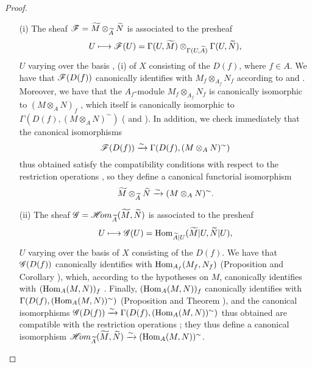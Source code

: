 \begin{proof}
\label{proof-1.1.3.12}
\medskip\noindent
\begin{itemize}
  \item[(i)] The sheaf $\mathscr{F}=\widetilde{M}\otimes_{\widetilde{A}}\widetilde{N}$ is associated to
    the presheaf
    \[
      U\longmapsto\mathscr{F}(U)
      =\Gamma(U,\widetilde{M})\otimes_{\Gamma(U,\widetilde{A})}\Gamma(U,\widetilde{N}),
    \]
    $U$ varying over the basis , (i) of $X$ consisting of the
    $D(f)$, where $f\in A$. We have that $\mathscr{F}(D(f))$ canonically identifies with
    $M_f\otimes_{A_f}N_f$ according to  and .
    Moreover, we have that the $A_f$-module $M_f\otimes_{A_f}N_f$ is canonically
    isomorphic to $(M\otimes_A N)_f$ , which itself is canonically
    isomorphic to $\Gamma(D(f),(M\otimes_A N)^\sim)$ ( and
    ). In addition, we check immediately that the canonical
    isomorphisms
    \[
      \mathscr{F}(D(f))\xrightarrow{\sim}\Gamma(D(f),(M\otimes_A N)^\sim)
    \]
    thus obtained satisfy the compatibility conditions with respect to the restriction
    operations , so they define a canonical functorial isomorphism
    \[
      \widetilde{M}\otimes_{\widetilde{A}}\widetilde{N}\xrightarrow{\sim}(M\otimes_A N)^\sim.
    \]
  \item[(ii)] The sheaf $\mathscr{G}=\mathscr{H}\!{om}_{\widetilde{A}}(\widetilde{M},\widetilde{N})$ is associated
    to the presheaf
    \[
      U\longmapsto\mathscr{G}(U)={\mathop{\mathrm{Hom}}\nolimits}_{\widetilde{A}|U}(\widetilde{M}|U,\widetilde{N}|U),
    \]
    $U$ varying over the basis of $X$ consisting of the $D(f)$. We have that $\mathscr{G}(D(f))$ canonically
    identifies with ${\mathop{\mathrm{Hom}}\nolimits}_{A_f}(M_f,N_f)$ (Proposition  and
    Corollary ), which, according to the hypotheses on $M$, canonically
    identifies with $({\mathop{\mathrm{Hom}}\nolimits}_A(M,N))_f$ . Finally, $({\mathop{\mathrm{Hom}}\nolimits}_A(M,N))_f$
    canonically identifies with $\Gamma(D(f),({\mathop{\mathrm{Hom}}\nolimits}_A(M,N))^\sim)$ (Proposition 
    and Theorem ), and the canonical isomorphisms
    $\mathscr{G}(D(f))\xrightarrow{\sim}\Gamma(D(f),({\mathop{\mathrm{Hom}}\nolimits}_A(M,N))^\sim)$ thus obtained are compatible with the restriction
    operations ; they thus define a canonical isomorphism
    $\mathscr{H}\!{om}_{\widetilde{A}}(\widetilde{M},\widetilde{N})\xrightarrow{\sim}({\mathop{\mathrm{Hom}}\nolimits}_A(M,N))^\sim$.
\end{itemize}
\end{proof}

